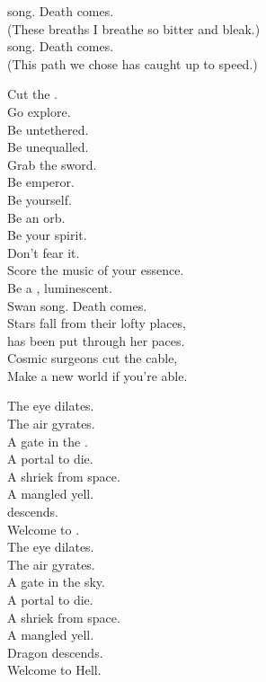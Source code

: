  song. Death comes. \\
(These breaths I breathe so bitter and bleak.) \\
 song. Death comes. \\
(This path we chose has caught up to speed.) \\


Cut the . \\
Go explore. \\
Be untethered. \\
Be unequalled. \\
Grab the sword. \\
Be emperor. \\
Be yourself. \\
Be an orb. \\
Be your spirit. \\
Don't fear it. \\
Score the music of your essence. \\
Be a , luminescent. \\
Swan song. Death comes. \\

Stars fall from their lofty places, \\
 has been put through her paces. \\
Cosmic surgeons cut the cable, \\
Make a new world if you're able. \\


The eye dilates. \\
The air gyrates. \\
A gate in the . \\
A portal to die. \\
A shriek from space. \\
A mangled yell. \\
 descends. \\
Welcome to . \\

The eye dilates. \\
The air gyrates. \\
A gate in the sky. \\
A portal to die. \\
A shriek from space. \\
A mangled yell. \\
Dragon descends. \\
Welcome to Hell. \\

